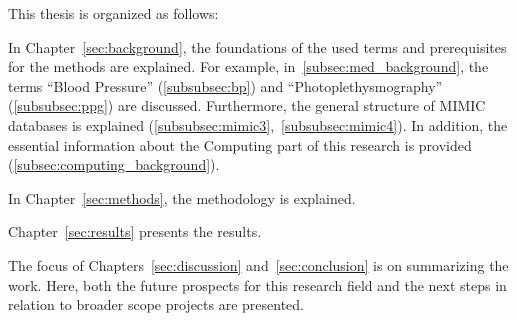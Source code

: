 This thesis is organized as follows:

In Chapter~\ref{sec:background}, the foundations of the used terms and prerequisites for the methods are explained.
For example, in~\ref{subsec:med_background}, the terms \enquote{Blood Pressure} (\ref{subsubsec:bp}) and \enquote{Photoplethysmography} (\ref{subsubsec:ppg}) are discussed.
Furthermore, the general structure of MIMIC databases is explained (\ref{subsubsec:mimic3},~\ref{subsubsec:mimic4}). In addition, the essential information about the Computing part of this research is provided (\ref{subsec:computing_background}).

In Chapter~\ref{sec:methods}, the methodology is explained.

Chapter~\ref{sec:results} presents the results.

The focus of Chapters~\ref{sec:discussion} and~\ref{sec:conclusion} is on summarizing the work.
Here, both the future prospects for this research field and the next steps in relation to broader scope projects are presented.